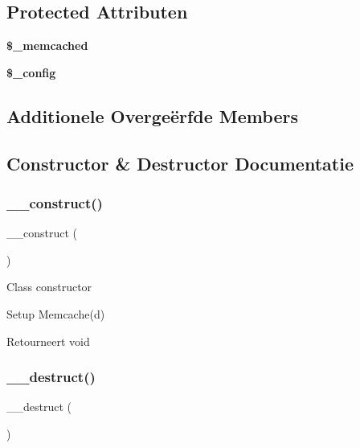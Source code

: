 \subsection*{Protected Attributen}
\begin{DoxyCompactItemize}
\item 
\mbox{\label{class_c_i___cache__memcached_a9ce5188201bbc41ed4374947a35dadcc}} 
{\bfseries \$\+\_\+memcached}
\item 
{\bfseries \$\+\_\+config}
\end{DoxyCompactItemize}
\subsection*{Additionele Overge\"{e}rfde Members}


\subsection{Constructor \& Destructor Documentatie}
\mbox{\label{class_c_i___cache__memcached_a095c5d389db211932136b53f25f39685}} 
\subsubsection{\texorpdfstring{\_\_construct()}{\_\_construct()}}
{\footnotesize\ttfamily \+\_\+\+\_\+construct (\begin{DoxyParamCaption}{ }\end{DoxyParamCaption})}

Class constructor

Setup Memcache(d)

\begin{DoxyReturn}{Retourneert}
void 
\end{DoxyReturn}
\mbox{\label{class_c_i___cache__memcached_a421831a265621325e1fdd19aace0c758}} 
\subsubsection{\texorpdfstring{\_\_destruct()}{\_\_destruct()}}
{\footnotesize\ttfamily \+\_\+\+\_\+destruct (\begin{DoxyParamCaption}{ }\end{DoxyParamCaption})}

